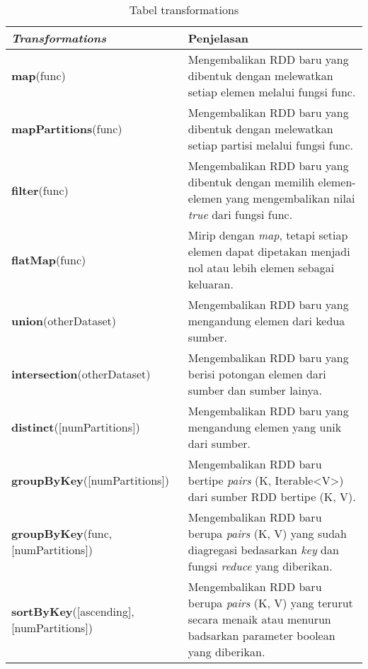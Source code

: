 \begin{table}[H] 
	\centering 
	\caption{Tabel transformations}
	\label{tab:trans}
	\begin{tabular}{p{6cm}p{9cm}}
		\toprule[1.5pt]
\hline
		 \textbf{\textit{Transformations}} & Penjelasan \\
\hline
\midrule

\hline
\textbf{map}(func) & Mengembalikan RDD baru yang dibentuk dengan melewatkan setiap elemen melalui fungsi func. \\
\hline

\textbf{mapPartitions}(func) & Mengembalikan RDD baru yang dibentuk dengan melewatkan setiap partisi melalui fungsi func.\\

\hline

\textbf{filter}(func) & Mengembalikan RDD baru yang dibentuk dengan memilih elemen-elemen yang mengembalikan nilai \textit{true} dari fungsi func. \\
\hline

\textbf{flatMap}(func) & Mirip dengan \textit{map}, tetapi setiap elemen dapat dipetakan menjadi nol atau lebih elemen sebagai keluaran. \\
\hline


\textbf{union}(otherDataset) & Mengembalikan RDD baru yang mengandung elemen dari kedua sumber.\\

\hline
\textbf{intersection}(otherDataset) & Mengembalikan RDD baru yang berisi potongan elemen dari sumber dan sumber lainya.\\ 

\hline
\textbf{distinct}([numPartitions]) & Mengembalikan RDD baru yang mengandung elemen yang unik dari sumber.\\

\hline
\textbf{groupByKey}([numPartitions]) & Mengembalikan RDD baru bertipe \textit{pairs}  (K, Iterable<V>) dari sumber RDD bertipe (K, V).\\


\hline
\textbf{groupByKey}(func,[numPartitions]) & Mengembalikan RDD baru berupa \textit{pairs} (K, V) yang sudah diagregasi bedasarkan \textit{key} dan fungsi \textit{reduce} yang diberikan.\\

\hline
\textbf{sortByKey}([ascending], [numPartitions]) & Mengembalikan RDD baru berupa \textit{pairs}  (K, V) yang terurut secara menaik atau menurun badsarkan parameter boolean yang diberikan.\\


\end{tabular}
\end{table}
